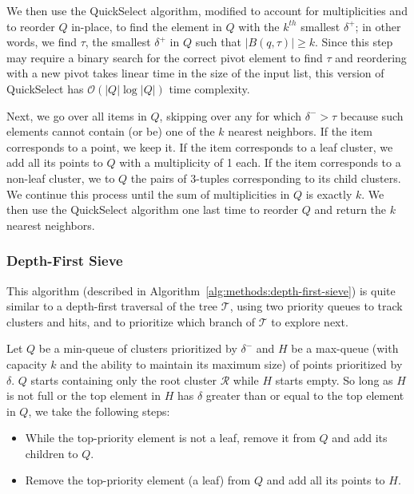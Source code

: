 We then use the QuickSelect algorithm, modified to account for multiplicities and to reorder $Q$ in-place, to find the element in $Q$ with the $k^{th}$ smallest $\delta^{+}$; in other words, we find $\tau$, the smallest $\delta^{+}$ in $Q$ such that $\left| B(q, \tau) \right| \geq k$.
Since this step may require a binary search for the correct pivot element to find $\tau$ and reordering with a new pivot takes linear time in the size of the input list, this version of QuickSelect has $\mathcal{O}\left(|Q| \log |Q|\right)$ time complexity.

Next, we go over all items in $Q$, skipping over any for which $\delta^{-} > \tau$ because such elements cannot contain (or be) one of the $k$ nearest neighbors.
If the item corresponds to a point, we keep it.
If the item corresponds to a leaf cluster, we add all its points to $Q$ with a multiplicity of 1 each.
If the item corresponds to a non-leaf cluster, we to $Q$ the pairs of 3-tuples corresponding to its child clusters.
We continue this process until the sum of multiplicities in $Q$ is exactly $k$.
We then use the QuickSelect algorithm one last time to reorder $Q$ and return the $k$ nearest neighbors.

\subsubsection{Depth-First Sieve}
\label{sec:methods:knn-search:depth-first-sieve}

This algorithm (described in Algorithm~\ref{alg:methods:depth-first-sieve}) is quite similar to a depth-first traversal of the tree $\mathcal{T}$, using two priority queues to track clusters and hits, and to prioritize which branch of $\mathcal{T}$ to explore next.

Let $Q$ be a min-queue of clusters prioritized by $\delta^{-}$ and $H$ be a max-queue (with capacity $k$ and the ability to maintain its maximum size) of points prioritized by $\delta$.
$Q$ starts containing only the root cluster $\mathcal{R}$ while $H$ starts empty.
So long as $H$ is not full or the top element in $H$ has $\delta$ greater than or equal to the top element in $Q$, we take the following steps:

\begin{itemize}
    \item While the top-priority element is not a leaf, remove it from $Q$ and add its children to $Q$.
    \item Remove the top-priority element (a leaf) from $Q$ and add all its points to $H$.
\end{itemize}

